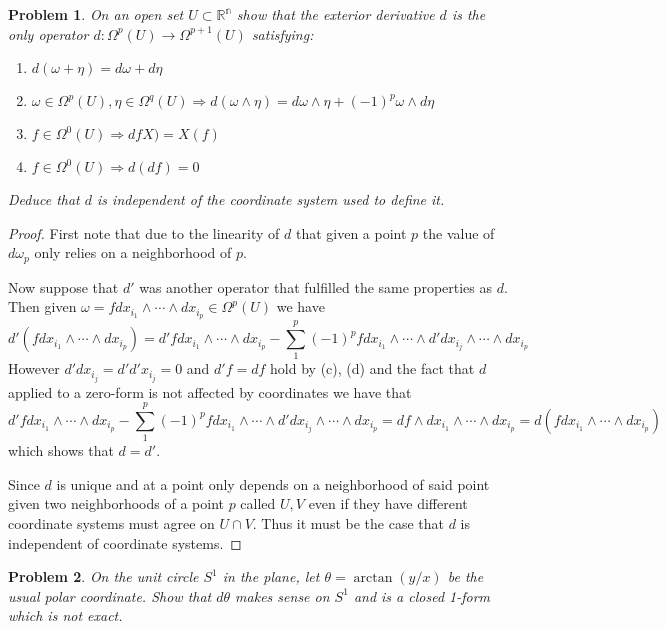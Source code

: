 \documentclass[10pt]{article}
\newcommand{\sk}{\vskip 10mm}
\newcommand{\bb}[1]{\mathbb{#1}}
\theoremstyle{plain}
\newtheorem{problem}{Problem}
\theoremstyle{remark}
\begin{document}
\begin{problem}
  On an open set $U\subset \bb{R^n}$ show that the exterior derivative $d$ is
  the only operator $d:\Omega^p(U)\rightarrow\Omega^{p+1}(U)$ satisfying:
  \begin{enumerate}
  \item[(a)] $d(\omega+\eta)=d\omega+d\eta$
  \item[(b)] $\omega\in\Omega^p(U),\eta\in\Omega^q(U)\Rightarrow
    d(\omega\wedge \eta)=d\omega\wedge\eta+(-1)^p\omega\wedge d\eta$
  \item[(c)] $f\in\Omega^0(U)\Rightarrow dfX)=X(f)$
  \item[(d)] $f\in\Omega^0(U)\Rightarrow d(df)=0$
  \end{enumerate}
  Deduce that $d$ is independent of the coordinate system used to define it.
\end{problem}

\begin{proof}
  First note that due to the linearity of $d$ that given a point $p$
  the value of $d\omega_p$ only relies on a neighborhood of $p$.

  Now suppose that $d'$ was another operator that fulfilled the same
  properties as $d$. Then given $\omega=fdx_{i_1}\wedge\cdots\wedge dx_{i_p}\in\Omega^p(U)$
  we have
  \[
    d'(fdx_{i_1}\wedge\cdots\wedge dx_{i_p})=d'fdx_{i_1}\wedge\cdots\wedge dx_{i_p} -\sum_1^p(-1)^pfdx_{i_1}\wedge\cdots\wedge d'dx_{i_j}\wedge\cdots\wedge dx_{i_p}
  \]
  However $d'dx_{i_j} = d'd'x_{i_j}= 0$ and $d'f=df$ hold by (c), (d) and the fact that
  $d$ applied to a zero-form is not affected by coordinates we have that
  \[
    d'fdx_{i_1}\wedge\cdots\wedge dx_{i_p} -\sum_1^p(-1)^pfdx_{i_1}\wedge\cdots\wedge d'dx_{i_j}\wedge\cdots\wedge dx_{i_p} = df\wedge dx_{i_1}\wedge\cdots\wedge dx_{i_p}=d(f dx_{i_1}\wedge\cdots\wedge dx_{i_p})
  \]
  which shows that $d = d'$.

  Since $d$ is unique and at a point only depends on a neighborhood of said point
  given two neighborhoods of a point $p$ called $U,V$ even if they have different
  coordinate systems must agree on $U\cap V$. Thus it must be the case that $d$ is
  independent of coordinate systems.
\end{proof}

\sk

\begin{problem}
  On the unit circle $S^1$ in the plane, let $\theta=\arctan(y/x)$ be the usual
  polar coordinate. Show that $d\theta$ makes sense on $S^1$ and is a closed
  1-form which is not exact.
\end{problem}
\end{document}
